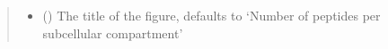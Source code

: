 \documentclass[letterpaper,10pt,english]{sphinxmanual}
\begin{document}
\begin{fulllineitems}
\begin{quote}
\begin{description}
\begin{itemize}
\item {} 
 (\sphinxstyleliteralemphasis{\sphinxupquote{, }}) \textendash{} The title of the figure, defaults to ‘Number of peptides per sub\sphinxhyphen{}cellular compartment’

\end{itemize}

\end{description}\end{quote}

\end{fulllineitems}

\end{document}
